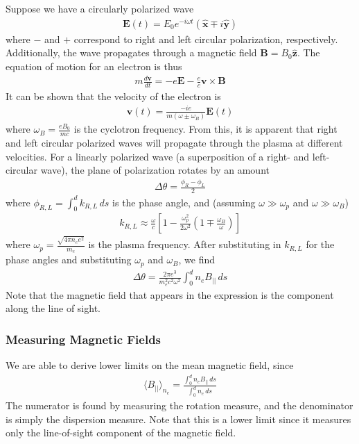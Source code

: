 \documentclass{article}
\begin{document}
Suppose we have a circularly polarized wave
\begin{align}
\mathbf{E}(t)=E_0 e^{-i\omega t}(\hat{\mathbf{x}}\mp i\hat{\mathbf{y}})
\end{align}
where $-$ and $+$ correspond to right and left circular polarization, respectively. Additionally, the wave propagates through a magnetic field $\mathbf{B}=B_0\hat{\mathbf{z}}$. The equation of motion for an electron is thus
\begin{align}
m\frac{d\mathbf{v}}{dt}=-e\mathbf{E}-\frac{e}{c}\mathbf{v}\times\mathbf{B}
\end{align}
It can be shown that the velocity of the electron is
\begin{align}
\mathbf{v}(t)=\frac{-ie}{m(\omega\pm\omega_B)}\mathbf{E}(t)
\end{align}
where 
$\omega_B=\frac{eB_0}{mc}$
is the cyclotron frequency. From this, it is apparent that right and left circular polarized waves will propagate through the plasma at different velocities. For a linearly polarized wave (a superposition of a right- and left- circular wave), the plane of polarization rotates by an amount
\begin{align}
\Delta\theta=\frac{\phi_R-\phi_L}{2}
\end{align}
where $\phi_{R,L}=\int_0^d k_{R,L}\,ds$ is the phase angle, and (assuming $\omega\gg\omega_p$ and $\omega\gg\omega_B$)
\begin{align}
k_{R,L}\approx \frac{\omega}{c}\left[1-\frac{\omega_p^2}{2\omega^2}\left(1\mp\frac{\omega_B}{\omega}\right)\right]
\end{align}
where $\omega_p=\frac{\sqrt{4\pi n_ee^2}}{m_e}$ is the plasma frequency. After substituting in $k_{R,L}$ for the phase angles and substituting $\omega_p$ and $\omega_B$, we find
\begin{align}
\Delta\theta = \frac{2\pi e^3}{m_e^2c^2\omega^2}\int_0^d n_e B_{||}\,ds
\end{align}
Note that the magnetic field that appears in the expression is the component along the line of sight.

\subsubsection{Measuring Magnetic Fields}

We are able to derive lower limits on the mean magnetic field, since
\begin{align}
\langle B_{||}\rangle_{n_e} = \frac{\int_0^d n_e B_{||}\,ds}{\int_0^d n_e\,ds}
\end{align}
The numerator is found by measuring the rotation measure, and the denominator is simply the dispersion measure. Note that this is a lower limit since it measures only the line-of-sight component of the magnetic field.
\end{document}
